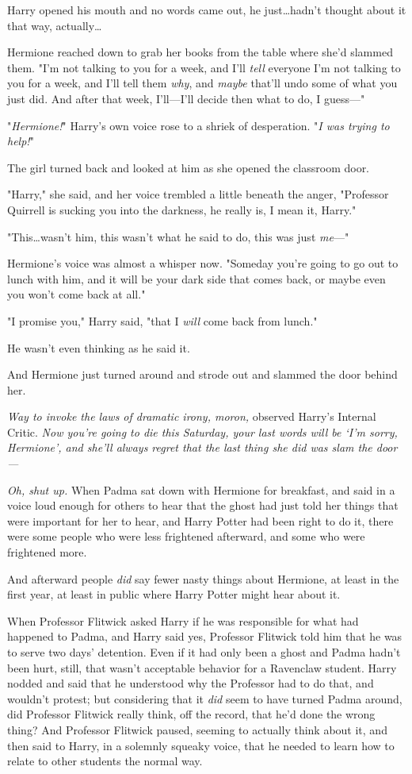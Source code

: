 Harry opened his mouth and no words came out, he just…hadn’t thought
about it that way, actually…

Hermione reached down to grab her books from the table where she’d slammed
them. "I’m not talking to you for a week, and I’ll \emph{tell} everyone I’m not
talking to you for a week, and I’ll tell them \emph{why}, and \emph{maybe}
that’ll undo some of what you just did. And after that week, I’ll—I’ll decide
then what to do, I guess—"

"\emph{Hermione!}" Harry’s own voice rose to a shriek of desperation. "\emph{I
was trying to help!}"

The girl turned back and looked at him as she opened the classroom door.

"Harry," she said, and her voice trembled a little beneath the anger,
"Professor Quirrell is sucking you into the darkness, he really is, I mean it,
Harry."

"This…wasn’t him, this wasn’t what he said to do, this was just
\emph{me}—"

Hermione’s voice was almost a whisper now. "Someday you’re going to go out to
lunch with him, and it will be your dark side that comes back, or maybe even
you won’t come back at all."

"I promise you," Harry said, "that I \emph{will} come back from lunch."

He wasn’t even thinking as he said it.

And Hermione just turned around and strode out and slammed the door behind her.

\emph{Way to invoke the laws of dramatic irony, moron,} observed Harry’s
Internal Critic. \emph{Now you’re going to die this Saturday, your last words
will be ‘I’m sorry, Hermione’, and she’ll always regret that the last thing she
did was slam the door—}

\emph{Oh, shut up.}
\later
When Padma sat down with Hermione for breakfast, and said in a voice loud
enough for others to hear that the ghost had just told her things that were
important for her to hear, and Harry Potter had been right to do it, there were
some people who were less frightened afterward, and some who were frightened
more.

And afterward people \emph{did} say fewer nasty things about Hermione, at least
in the first year, at least in public where Harry Potter might hear about it.

When Professor Flitwick asked Harry if he was responsible for what had happened
to Padma, and Harry said yes, Professor Flitwick told him that he was to serve
two days’ detention. Even if it had only been a ghost and Padma hadn’t been
hurt, still, that wasn’t acceptable behavior for a Ravenclaw student. Harry
nodded and said that he understood why the Professor had to do that, and
wouldn’t protest; but considering that it \emph{did} seem to have turned Padma
around, did Professor Flitwick really think, off the record, that he’d done the
wrong thing? And Professor Flitwick paused, seeming to actually think about it,
and then said to Harry, in a solemnly squeaky voice, that he needed to learn
how to relate to other students the normal way.

